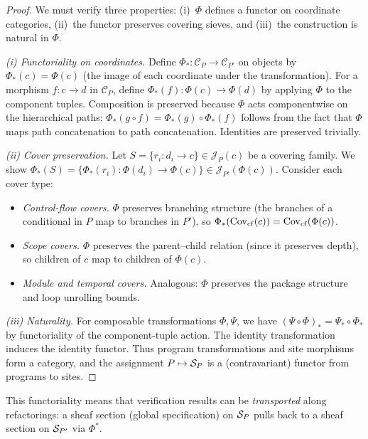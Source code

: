 \documentclass[11pt]{article}
\begin{document}
\begin{proof}
We must verify three properties: (i)~$\Phi$ defines a functor on coordinate
categories, (ii)~the functor preserves covering sieves, and (iii)~the
construction is natural in $\Phi$.

\emph{(i) Functoriality on coordinates.}
Define $\Phi_* \colon \mathcal{C}_P \to \mathcal{C}_{P'}$ on objects by
$\Phi_*(c) = \Phi(c)$ (the image of each coordinate under the transformation).
For a morphism $f \colon c \to d$ in $\mathcal{C}_P$, define
$\Phi_*(f) \colon \Phi(c) \to \Phi(d)$ by applying $\Phi$ to the component
tuples.  Composition is preserved because $\Phi$ acts componentwise on the
hierarchical paths:
$\Phi_*(g \circ f) = \Phi_*(g) \circ \Phi_*(f)$ follows from the fact that
$\Phi$ maps path concatenation to path concatenation.  Identities are preserved
trivially.

\emph{(ii) Cover preservation.}
Let $S = \{r_i \colon d_i \to c\} \in \mathscr{J}_P(c)$ be a covering family.
We show $\Phi_*(S) = \{\Phi_*(r_i) \colon \Phi(d_i) \to \Phi(c)\} \in
\mathscr{J}_{P'}(\Phi(c))$.  Consider each cover type:
\begin{itemize}[nosep]
  \item \emph{Control-flow covers.} $\Phi$ preserves branching structure
        (the branches of a conditional in $P$ map to branches in $P'$), so
        $\Phi_*(\mathrm{Cov}_{\mathrm{cf}}(c)) = \mathrm{Cov}_{\mathrm{cf}}(\Phi(c))$.
  \item \emph{Scope covers.} $\Phi$ preserves the parent--child relation
        (since it preserves depth), so children of $c$ map to children of
        $\Phi(c)$.
  \item \emph{Module and temporal covers.} Analogous: $\Phi$ preserves the
        package structure and loop unrolling bounds.
\end{itemize}

\emph{(iii) Naturality.}
For composable transformations $\Phi, \Psi$, we have
$(\Psi \circ \Phi)_* = \Psi_* \circ \Phi_*$ by functoriality of the
component-tuple action.  The identity transformation induces the identity functor.
Thus program transformations and site morphisms form a category, and the
assignment $P \mapsto \mathcal{S}_P$ is a (contravariant) functor from programs to sites.
\end{proof}

This functoriality means that verification results can be \emph{transported}
along refactorings: a sheaf section (global specification) on $\mathcal{S}_P$
pulls back to a sheaf section on $\mathcal{S}_{P'}$ via $\Phi^*$.
\end{document}
